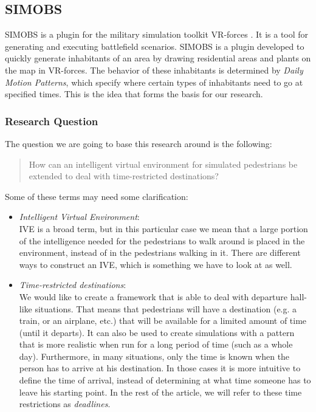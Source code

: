 \documentclass[11pt]{article}
\begin{document}
\subsection{SIMOBS}
SIMOBS is a plugin for the military simulation toolkit VR-forces \cite{vrforces}.  It is a tool for generating and executing battlefield scenarios. SIMOBS is a plugin developed to quickly generate inhabitants of an area by drawing residential areas and plants on the map in VR-forces. The behavior of these inhabitants is determined by \emph{Daily Motion Patterns}, which specify where certain types of inhabitants need to go at specified times. This is the idea that forms the basis for our research.


\subsubsection{Research Question}
The question we are going to base this research around is the following:
\begin{quote}
How can an intelligent virtual environment for simulated pedestrians be extended to deal with time-restricted destinations?
\end{quote}
Some of these terms may need some clarification:
\begin{itemize}
\item \emph{Intelligent Virtual Environment}:\\
IVE is a broad term, but in this particular case we mean that a large portion of the intelligence needed for the pedestrians to walk around is placed in the environment, instead of in the pedestrians walking in it. There are different ways to construct an IVE, which is something we have to look at as well.

\item \emph{Time-restricted destinations}:\\
We would like to create a framework that is able to deal with departure hall-like situations. That means that pedestrians will have a destination (e.g. a train, or an airplane, etc.) that will be available for a limited amount of time (until it departs). It can also be used to create simulations with a pattern that is more realistic when run for a long period of time (such as a whole day). Furthermore, in many situations, only the time is known when the person has to arrive at his destination. In those cases it is more intuitive to define the time of arrival, instead of determining at what time someone has to leave his starting point. In the rest of the article, we will refer to these time restrictions as \emph{deadlines}.
\end{itemize}
\end{document}

